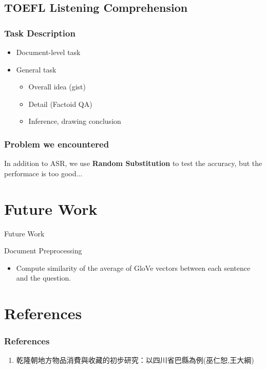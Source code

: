 \documentclass{beamer}
\begin{document}
\subsection{TOEFL Listening Comprehension}
\begin{frame}
	\frametitle{Task Description}
	\begin{itemize}
	    \item Document-level task
	    \item General task
	    \begin{itemize}
	        \item Overall idea (gist)
	        \item Detail (Factoid QA)
	        \item Inference, drawing conclusion
	    \end{itemize}
	\end{itemize}
	
\end{frame}




\begin{frame}
    \frametitle{Problem we encountered}
    In addition to ASR, we use \textbf{Random Substitution} to test the accuracy, but the performace is too good...
\end{frame}

\section{Future Work}
\begin{frame}{Future Work}
    \begin{block}{Document Preprocessing}
        \begin{itemize}
            \item Compute similarity of the average of GloVe vectors between each sentence and the question.
        \end{itemize}
    \end{block}
\end{frame}

\section{References}
\begin{frame}
	\frametitle{References}
	\begin{enumerate}
		\item 乾隆朝地方物品消費與收藏的初步研究：以四川省巴縣為例(巫仁恕,王大綱)
	\end{enumerate}
\end{frame}
\end{document}
